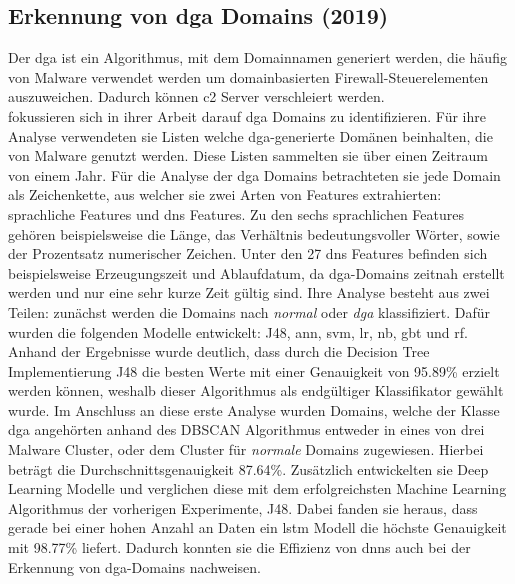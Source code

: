 \documentclass[
    12pt, %
    DIV10,
    ngerman, %
    a4paper, %
    oneside, %
    titlepage, %
    parskip=half, %
    headings=normal, %
    listof=totoc, %
    bibliography=totoc, %
    index=totoc, %
    captions=tableheading, %
    final %
]{scrreprt}
\begin{document}
\subsection{Erkennung von \acs{dga} Domains (2019)}
Der \ac{dga} ist ein Algorithmus, mit dem Domainnamen generiert werden, die häufig von Malware verwendet werden um domainbasierten Firewall-Steuerelementen auszuweichen. Dadurch können \ac{c2} Server verschleiert werden.\\
\textcite{Li2019} fokussieren sich in ihrer Arbeit darauf \ac{dga} Domains zu identifizieren. Für ihre Analyse verwendeten sie Listen \parencite{Bam} welche \ac{dga}-generierte Domänen beinhalten, die von Malware genutzt werden. Diese Listen sammelten sie über einen Zeitraum von einem Jahr. Für die Analyse der \ac{dga} Domains betrachteten sie jede Domain als Zeichenkette, aus welcher sie zwei Arten von Features extrahierten: sprachliche Features und \ac{dns} Features. Zu den sechs sprachlichen Features gehören beispielsweise die Länge, das Verhältnis bedeutungsvoller Wörter, sowie der Prozentsatz numerischer Zeichen. Unter den 27 \ac{dns} Features befinden sich beispielsweise Erzeugungszeit und Ablaufdatum, da \ac{dga}-Domains zeitnah erstellt werden und nur eine sehr kurze Zeit gültig sind. Ihre Analyse besteht aus zwei Teilen: zunächst werden die Domains nach \emph{normal} oder \emph{\ac{dga}} klassifiziert. Dafür wurden die folgenden Modelle entwickelt: J48, \ac{ann}, \ac{svm}, \ac{lr}, \ac{nb}, \ac{gbt} und \ac{rf}. Anhand der Ergebnisse wurde deutlich, dass durch die Decision Tree Implementierung J48 die besten Werte mit einer Genauigkeit von 95.89\% erzielt werden können, weshalb dieser Algorithmus als endgültiger Klassifikator gewählt wurde.
Im Anschluss an diese erste Analyse wurden Domains, welche der Klasse \ac{dga} angehörten anhand des DBSCAN Algorithmus entweder in eines von drei Malware Cluster, oder dem Cluster für \emph{normale} Domains zugewiesen. Hierbei beträgt die Durchschnittsgenauigkeit 87.64\%. Zusätzlich entwickelten sie Deep Learning Modelle und verglichen diese mit dem erfolgreichsten Machine Learning Algorithmus der vorherigen Experimente, J48. Dabei fanden sie heraus, dass gerade bei einer hohen Anzahl an Daten ein \ac{lstm} Modell die höchste Genauigkeit mit 98.77\% liefert. Dadurch konnten sie die Effizienz von \ac{dnns} auch bei der Erkennung von \ac{dga}-Domains nachweisen.
%
\end{document}

